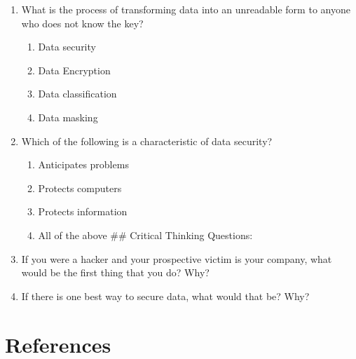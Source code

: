 \documentclass[
  letterpaper,
  DIV=11,
  numbers=noendperiod]{scrreprt}
\providecommand{\tightlist}{%
  \setlength{\itemsep}{0pt}\setlength{\parskip}{0pt}}\usepackage{longtable,booktabs,array}
\begin{document}
\begin{enumerate}
\def\labelenumi{\arabic{enumi}.}
\tightlist
\item
  What is the process of transforming data into an unreadable form to
  anyone who does not know the key?

  \begin{enumerate}
  \def\labelenumii{\alph{enumii}.}
  \tightlist
  \item
    Data security
  \item
    Data Encryption
  \item
    Data classification
  \item
    Data masking
  \end{enumerate}
\item
  Which of the following is a characteristic of data security?

  \begin{enumerate}
  \def\labelenumii{\alph{enumii}.}
  \tightlist
  \item
    Anticipates problems
  \item
    Protects computers
  \item
    Protects information
  \item
    All of the above \#\# Critical Thinking Questions:
  \end{enumerate}
\item
  If you were a hacker and your prospective victim is your company, what
  would be the first thing that you do? Why?
\item
  If there is one best way to secure data, what would that be? Why?
\end{enumerate}

\section{References}\label{references-1}
\end{document}
